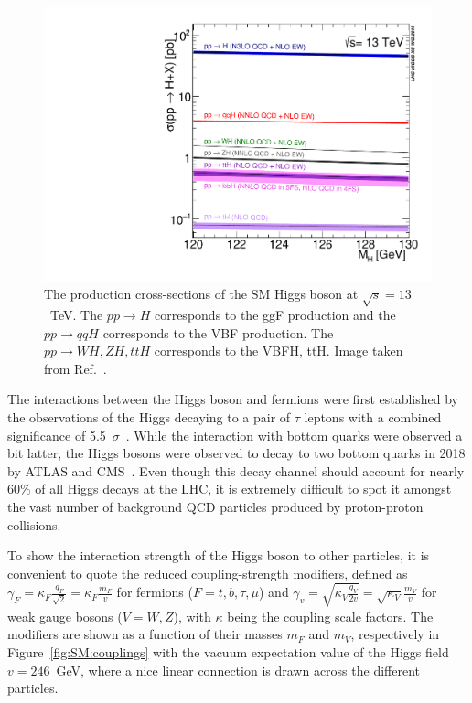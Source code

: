 \begin{figure}[htbp]
\centering
\includegraphics[width=.61\textwidth]{theory/plots/plot_13tev_H_sqrt.pdf}
\caption{The production cross-sections of the SM Higgs boson 
    at $\sqrt{s} =13$~TeV.  The $pp\rightarrow H$ corresponds to the 
    ggF production and the $pp\rightarrow qqH$ corresponds to the VBF production. 
    The $pp\rightarrow WH, ZH, ttH$ corresponds to the VBFH, ttH. 
    Image taken from Ref.~\cite{dihiggs-twiki}. }
    \label{fig:SM:cross-sections}
\end{figure}


The interactions between the Higgs boson and fermions were first established by 
the observations of the Higgs decaying to a pair of $\tau$ 
leptons with a combined significance of 5.5~$\sigma$~\cite{HIGG-2013-32,HIGG-2015-07}. 
While the interaction with bottom quarks were observed a bit latter, 
the Higgs bosons were observed to decay to two 
bottom quarks in 2018 by ATLAS and CMS~\cite{HIGG-2018-04,CMS-HIG-18-016}.
Even though this decay channel should account for 
nearly 60\% of all Higgs decays at the LHC, it is extremely difficult 
to spot it amongst the vast number of background QCD particles
produced by proton-proton collisions.

To show the interaction strength of the Higgs boson to other particles,
it is convenient to quote the reduced coupling-strength modifiers, defined as
$\gamma_F = \kappa_F \frac{g_F}{\sqrt{2}} =\kappa_F \frac{m_F}{v}$ 
for fermions ($F=t,b,\tau,\mu$) 
and $\gamma_v = \sqrt{\kappa_V \frac{g_V}{2v}} = \sqrt{\kappa_V}\frac{m_V}{v}$ 
for weak gauge bosons ($V=W,Z$), with
$\kappa$ being the coupling scale factors. 
The modifiers are shown as a function of 
their masses $m_F$ and $m_V$, respectively in Figure~\ref{fig:SM:couplings} 
with the vacuum expectation value of the Higgs field $v=246$~GeV, where a nice 
linear connection is drawn across the different particles. 


